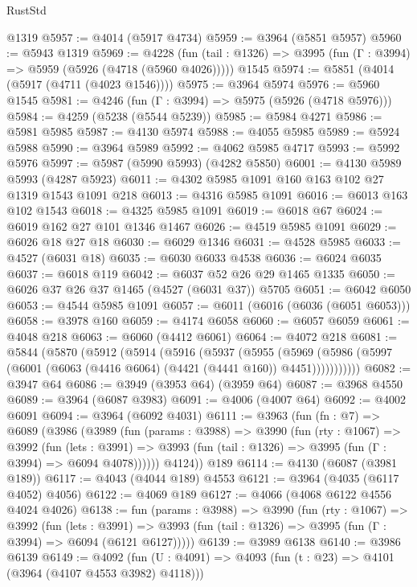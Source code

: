 \begin{lexlean}{RustStd}
\begin{coremodule}
    @1319
@5957 := @4014 (@5917 @4734)
@5959 := @3964 (@5851 @5957)
@5960 := @5943 @1319
@5969 := @4228
    (fun (tail : @1326) => @3995 (fun (Γ : @3994) => @5959 (@5926 (@4718 (@5960 @4026)))))
    @1545
@5974 := @5851 (@4014 (@5917 (@4711 (@4023 @1546))))
@5975 := @3964 @5974
@5976 := @5960 @1545
@5981 := @4246 (fun (Γ : @3994) => @5975 (@5926 (@4718 @5976)))
@5984 := @4259 (@5238 (@5544 @5239))
@5985 := @5984 @4271
@5986 := @5981 @5985
@5987 := @4130 @5974
@5988 := @4055 @5985
@5989 := @5924 @5988
@5990 := @3964 @5989
@5992 := @4062 @5985 @4717
@5993 := @5992 @5976
@5997 := @5987 (@5990 @5993) (@4282 @5850)
@6001 := @4130 @5989 @5993 (@4287 @5923)
@6011 := @4302 @5985 @1091 @160 @163 @102 @27 @1319 @1543 @1091 @218
@6013 := @4316 @5985 @1091
@6016 := @6013 @163 @102 @1543
@6018 := @4325 @5985 @1091
@6019 := @6018 @67
@6024 := @6019 @162 @27 @101 @1346 @1467
@6026 := @4519 @5985 @1091
@6029 := @6026 @18 @27 @18
@6030 := @6029 @1346
@6031 := @4528 @5985
@6033 := @4527 (@6031 @18)
@6035 := @6030 @6033 @4538
@6036 := @6024 @6035
@6037 := @6018 @119
@6042 := @6037 @52 @26 @29 @1465 @1335
@6050 := @6026 @37 @26 @37 @1465 (@4527 (@6031 @37)) @5705
@6051 := @6042 @6050
@6053 := @4544 @5985 @1091
@6057 := @6011 (@6016 (@6036 (@6051 @6053)))
@6058 := @3978 @160
@6059 := @4174 @6058
@6060 := @6057 @6059
@6061 := @4048 @218
@6063 := @6060 (@4412 @6061)
@6064 := @4072 @218
@6081 := @5844
    (@5870
      (@5912
        (@5914
          (@5916
            (@5937
              (@5955
                (@5969
                  (@5986 (@5997 (@6001 (@6063 (@4416 @6064) (@4421 (@4441 @160)) @4451)))))))))))
@6082 := @3947 @64
@6086 := @3949 (@3953 @64) (@3959 @64)
@6087 := @3968 @4550
@6089 := @3964 (@6087 @3983)
@6091 := @4006 (@4007 @64)
@6092 := @4002 @6091
@6094 := @3964 (@6092 @4031)
@6111 := @3963
    (fun (fn : @7) =>
    @6089
      (@3986
        (@3989
          (fun (params : @3988) =>
          @3990
            (fun (rty : @1067) =>
            @3992
              (fun (lets : @3991) =>
              @3993 (fun (tail : @1326) => @3995 (fun (Γ : @3994) => @6094 @4078))))))
        @4124))
    @189
@6114 := @4130 (@6087 (@3981 @189))
@6117 := @4043 (@4044 @189) @4553
@6121 := @3964 (@4035 (@6117 @4052) @4056)
@6122 := @4069 @189
@6127 := @4066 (@4068 @6122 @4556 @4024 @4026)
@6138 := fun (params : @3988) =>
  @3990
    (fun (rty : @1067) =>
    @3992
      (fun (lets : @3991) =>
      @3993 (fun (tail : @1326) => @3995 (fun (Γ : @3994) => @6094 (@6121 @6127)))))
@6139 := @3989 @6138
@6140 := @3986 @6139
@6149 := @4092 (fun (U : @4091) => @4093 (fun (t : @23) => @4101 (@3964 (@4107 @4553 @3982) @4118)))

\end{coremodule}
\end{lexlean}
